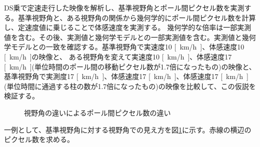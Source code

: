 DS乗で定速走行した映像を解析し、基準視野角とポール間ピクセル数を実測する。基準視野角と、ある視野角の関係から幾何学的にポール間ピクセル数を計算し、定速度値に乗じることで体感速度を実測する。
幾何学的な倍率は一部実測値を含む。その後、実測値と幾何学モデルとの一部実測値を含む。実測値と幾何学モデルとの一致を確認する。基準視野角で実速度10 \si{[km/h]}、体感速度10 \si{[km/h]}の映像と、
ある視野角を変えて実速度10 \si{[km/h]}、体感速度17 \si{[km/h]}(単位時間のポール間の移動ピクセル数が1.7倍になったもの)の映像と、基準視野角で実測度17 \si{[km/h]}、体感速度17 \si{[km/h]}、体感速度17 \si{[km/h]}
(単位時間に通過する柱の数が1.7倍になったもの)の映像を比較して、この仮説を検証する。

\begin{figure}[h]
  \begin{center}
  \caption{視野角の違いによるポール間ピクセル数の違い}
  \label{taikan:px_sv}
  \end{center}
\end{figure}

一例として、基準視野角に対する視野角での見え方を図\ref{taikan:px_sv}に示す。赤線の横辺のピクセル数を求める。

